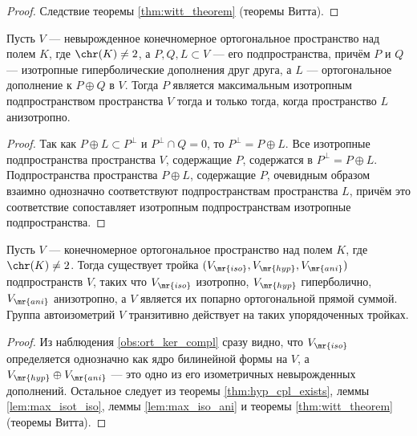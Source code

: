 \documentclass[
	extrafontsizes,
	11pt,
	hyphens,
]{memoir}
\begin{document}
\begin{proof}
Следствие теоремы \ref{thm:witt_theorem} (теоремы Витта).
\end{proof}

\begin{lemma}
Пусть \(V\) --- невырожденное конечномерное ортогональное пространство над полем \(K\), где \(\chr(K) \neq 2\), а \(P, Q, L \subset V\) --- его подпространства, причём \(P\) и \(Q\) --- изотропные гиперболические дополнения друг друга, а \(L\) --- ортогональное дополнение к \(P \oplus Q\) в \(V\).
\label{lem:max_iso_ani}
Тогда \(P\) является максимальным изотропным подпространством пространства \(V\) тогда и только тогда, когда пространство \(L\) анизотропно.
\end{lemma}

\begin{proof}
Так как \(P \oplus L \subset P^\perp\) и \(P^\perp \cap Q = 0\), то \(P^\perp = P \oplus L\).
Все изотропные подпространства пространства \(V\), содержащие \(P\), содержатся в \(P^\perp = P \oplus L\).
Подпространства пространства \(P \oplus L\), содержащие \(P\), очевидным образом взаимно однозначно соответствуют подпространствам пространства \(L\), причём это соответствие сопоставляет изотропным подпространствам изотропные подпространства.
\end{proof}

\begin{theorem}
Пусть \(V\) --- конечномерное ортогональное пространство над полем \(K\), где \(\chr(K) \neq 2\).
Тогда существует тройка \((V_\mr{iso}, V_\mr{hyp}, V_\mr{ani})\) подпространств \(V\), таких что \(V_\mr{iso}\) изотропно, \(V_\mr{hyp}\) гиперболично, \(V_\mr{ani}\) анизотропно, а \(V\) является их попарно ортогональной прямой суммой.
Группа автоизометрий \(V\) транзитивно действует на таких упорядоченных тройках.
\end{theorem}

\begin{proof}
Из наблюдения \ref{obs:ort_ker_compl} сразу видно, что \(V_\mr{iso}\) определяется однозначно как ядро билинейной формы на \(V\), а \(V_\mr{hyp} \oplus V_\mr{ani}\) --- это одно из его изометричных невырожденных дополнений.
Остальное следует из теоремы \ref{thm:hyp_cpl_exists}, леммы \ref{lem:max_isot_iso}, леммы \ref{lem:max_iso_ani} и теоремы \ref{thm:witt_theorem} (теоремы Витта).
\end{proof}
\end{document}
